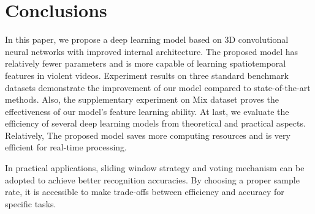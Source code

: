 \documentclass[10pt,twocolumn,letterpaper]{article}
\begin{document}

\section{Conclusions}
In this paper, we propose a deep learning model based on 3D convolutional neural networks with improved internal architecture. 
The proposed model has relatively fewer parameters and is more capable of learning spatiotemporal features in violent videos. 
Experiment results on three standard benchmark datasets demonstrate the improvement of our model compared to state-of-the-art methods. 
Also, the supplementary experiment on Mix dataset proves the effectiveness of our model's feature learning ability. 
At last, we evaluate the efficiency of several deep learning models from theoretical and practical aspects. 
Relatively, The proposed model saves more computing resources and is very efficient for real-time processing. 

In practical applications, sliding window strategy and voting mechanism can be adopted to achieve better recognition accuracies. 
By choosing a proper sample rate, it is accessible to make trade-offs between efficiency and accuracy for specific tasks.

{\small


}


\rule{0pt}{1pt}\newpage
\end{document}
